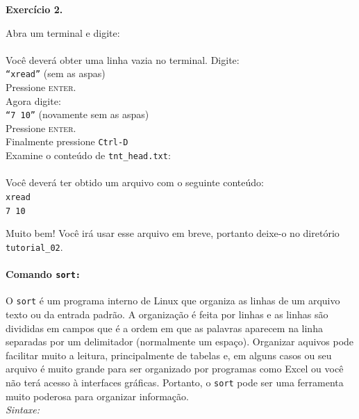 \begin{refsection}
\begin{blackBlock}{\textbf{Exercício 2.}}\label{tut2:ex:2.\arabic{ex}}

Abra um terminal e digite:\\
\\

Você deverá obter uma linha vazia no terminal. Digite:\\
\texttt{``xread''} (sem as aspas)\\
Pressione \textsc{enter}.\\
Agora digite:\\
\texttt{``7 10''} (novamente sem as aspas)\\
Pressione \textsc{enter}.\\
Finalmente pressione  \texttt{Ctrl-D}\\

Examine o conteúdo de \texttt{tnt\_head.txt}:\\
\\

Você deverá ter obtido um arquivo com o seguinte conteúdo:\\
\texttt{xread}\\
\texttt{7 10}\\
\end{blackBlock}

Muito bem! Você irá usar esse arquivo em breve, portanto deixe-o no diretório \texttt{tutorial\_02}.\\

\paragraph{Comando \texttt{sort:}}\label{tut2:text:editors:texttools:sort}
O \texttt{sort} é um programa interno de Linux que organiza as linhas de um arquivo texto ou da entrada padrão. A organização é feita por linhas e as linhas são divididas em campos que é a ordem em que as palavras aparecem na linha separadas por um delimitador (normalmente um espaço). Organizar aquivos pode facilitar muito a leitura, principalmente de tabelas e, em alguns casos ou seu arquivo é muito grande para ser organizado por programas como Excel ou você não terá acesso à interfaces gráficas. Portanto, o \texttt{sort} pode ser uma ferramenta muito poderosa para organizar informação.\\

\textit{Sintaxe:}\\


\end{refsection}
